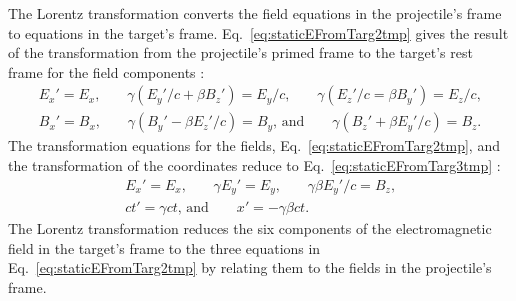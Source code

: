     The Lorentz transformation converts the field equations in the 
      projectile's frame to equations in the target's frame.
    Eq.~\ref{eq:staticEFromTarg2tmp} gives the result of the transformation 
      from the projectile's primed frame to the target's rest frame for 
      the field components \cite{WWJackson}:
    \begin{eqnarray} \label{eq:staticEFromTarg2tmp}
        E_{x}'=E_{x}\textrm{,}\qquad
        \gamma\left(E_{y}'/c+\beta B_{z}'\right)=E_{y}/c\textrm{,}\qquad
        \gamma\left(E_{z}'/c=\beta B_{y}'\right)=E_{z}/c\textrm{,} \nonumber \\
        B_{x}'=B_{x}\textrm{,}\qquad
        \gamma\left(B_{y}'-\beta E_{z}'/c\right)=B_{y}\textrm{, and}\qquad
        \gamma\left(B_{z}'+\beta E_{y}'/c\right)=B_{z}\textrm{.}
    \end{eqnarray}
    The transformation equations for the fields, 
      Eq.~\ref{eq:staticEFromTarg2tmp}, and the transformation of the 
      coordinates reduce to Eq.~\ref{eq:staticEFromTarg3tmp} \cite{WWJackson}:
    \begin{eqnarray} \label{eq:staticEFromTarg3tmp}
        E_{x}'=E_{x}\textrm{,}\qquad
        \gamma E_{y}'=E_{y}\textrm{,}\qquad
        \gamma \beta E_{y}'/c=B_{z}\textrm{,}\nonumber \\
        ct'=\gamma ct\textrm{, and}\qquad
        x'=-\gamma \beta c t\textrm{.}
    \end{eqnarray}
    The Lorentz transformation reduces the six components of the 
      electromagnetic field in the target's frame to the three equations in 
      Eq.~\ref{eq:staticEFromTarg2tmp} by relating them to the fields in the 
      projectile's frame. 
    
